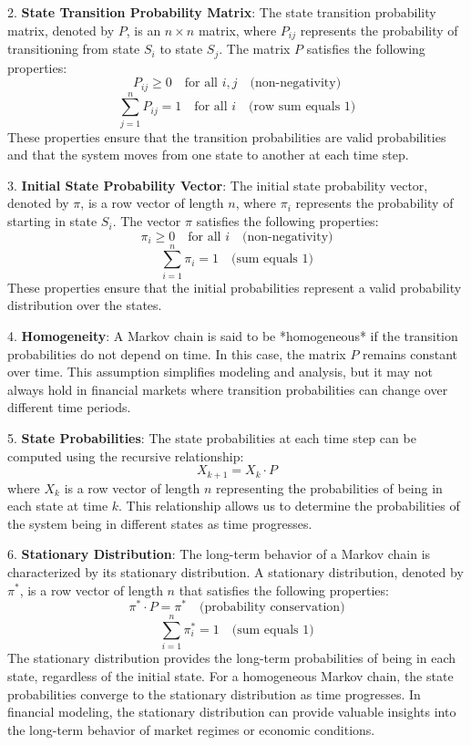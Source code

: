 \documentclass[a4paper,11pt]{article}
\begin{document}
2. \textbf{State Transition Probability Matrix}: The state transition probability matrix, denoted by $P$, is an $n \times n$ matrix, where $P_{ij}$ represents the probability of transitioning from state $S_i$ to state $S_j$. The matrix $P$ satisfies the following properties:
\[
P_{ij} \geq 0 \quad \text{for all } i, j \quad \text{(non-negativity)}
\]
\[
\sum_{j=1}^{n} P_{ij} = 1 \quad \text{for all } i \quad \text{(row sum equals 1)}
\]
These properties ensure that the transition probabilities are valid probabilities and that the system moves from one state to another at each time step.

3. \textbf{Initial State Probability Vector}: The initial state probability vector, denoted by $\pi$, is a row vector of length $n$, where $\pi_i$ represents the probability of starting in state $S_i$. The vector $\pi$ satisfies the following properties:
\[
\pi_i \geq 0 \quad \text{for all } i \quad \text{(non-negativity)}
\]
\[
\sum_{i=1}^{n} \pi_i = 1 \quad \text{(sum equals 1)}
\]
These properties ensure that the initial probabilities represent a valid probability distribution over the states.

4. \textbf{Homogeneity}: A Markov chain is said to be *homogeneous* if the transition probabilities do not depend on time. In this case, the matrix $P$ remains constant over time. This assumption simplifies modeling and analysis, but it may not always hold in financial markets where transition probabilities can change over different time periods.

5. \textbf{State Probabilities}: The state probabilities at each time step can be computed using the recursive relationship:
\[
X_{k+1} = X_k \cdot P
\]
where $X_k$ is a row vector of length $n$ representing the probabilities of being in each state at time $k$. This relationship allows us to determine the probabilities of the system being in different states as time progresses.

6. \textbf{Stationary Distribution}: The long-term behavior of a Markov chain is characterized by its stationary distribution. A stationary distribution, denoted by $\pi^*$, is a row vector of length $n$ that satisfies the following properties:
\[
\pi^* \cdot P = \pi^* \quad \text{(probability conservation)}
\]
\[
\sum_{i=1}^{n} \pi^*_i = 1 \quad \text{(sum equals 1)}
\]
The stationary distribution provides the long-term probabilities of being in each state, regardless of the initial state. For a homogeneous Markov chain, the state probabilities converge to the stationary distribution as time progresses. In financial modeling, the stationary distribution can provide valuable insights into the long-term behavior of market regimes or economic conditions.
\end{document}
